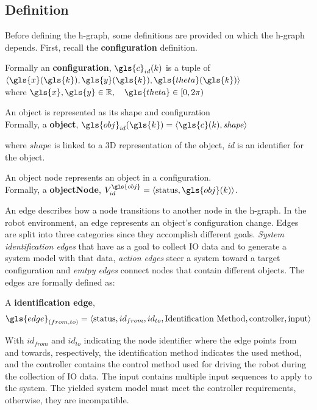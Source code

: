 \subsection{Definition}%
\label{subsec:h-graph_definition}%
Before defining the \ac{h-graph}, some definitions are provided on which the \ac{h-graph} depends. First, recall the \textbf{configuration} definition.\bs

Formally an \textbf{configuration}, $\gls{c}_{id}(k)$ is a tuple of $\left\langle \gls{x}(\gls{k}), \gls{y}(\gls{k}), \gls{theta}(\gls{k})\right\rangle$\\ where $\gls{x}, \gls{y} \in \mathbb{R}, \quad  \gls{theta} \in [0, 2\pi)$\bs

An object is represented as its shape and configuration\\Formally, a \textbf{object},  $\gls{obj}_{id}(\gls{k}) = \left\langle \gls{c}(k), \mathit{shape} \right\rangle $\bs

where $\mathit{shape}$ is linked to a 3D representation of the object, \textit{id} is an identifier for the object.\bs

An object node represents an object in a configuration.\\Formally, a \textbf{objectNode}, $V^{\gls{obj}}_{id} =\left\langle \textrm{status}, \gls{obj}(k)\right\rangle $.\bs

An edge describes how a node transitions to another node in the \ac{h-graph}. In the robot environment, an edge represents an object's configuration change. Edges are split into three categories since they accomplish different goals. \textit{System identification edges} that have as a goal to collect \ac{IO} data and to generate a system model with that data, \textit{action edges} steer a system toward a target configuration and \textit{emtpy edges} connect nodes that contain different objects. The edges are formally defined as:\bs

A \textbf{identification edge}, \[\gls{edge}_{(from, to)} = \left\langle \textrm{status}, id_{from}, id_{to}, \textrm{Identification Method}, \textrm{controller}, \textrm{input}\right\rangle\]\bs

With $id_{from}$ and $id_{to}$ indicating the node identifier where the edge points from and towards, respectively, the identification method indicates the used method, and the controller contains the control method used for driving the robot during the collection of \ac{IO} data. The input contains multiple input sequences to apply to the system. The yielded system model must meet the controller requirements, otherwise, they are incompatible.\bs

